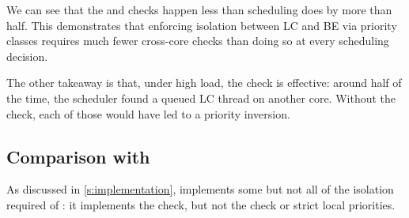 We can see that the \entry{} and \exit{} checks happen less than scheduling does
by more than half. This demonstrates that enforcing isolation between LC and BE
via priority classes requires much fewer cross-core checks than doing so at
every scheduling decision.

The other takeaway is that, under high load, the \exit{} check is effective:
around half of the time, the scheduler found a queued LC thread on another core.
Without the check, each of those would have led to a priority inversion.


\subsection{Comparison with \schedidle}\label{ss:eval:schedidle}

As discussed in \autoref{s:implementation}, \schedidle{} implements some but not
all of the isolation required of \beclass{}: it implements the \entry{} check,
but not the \exit{} check or strict local priorities.

